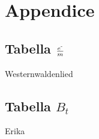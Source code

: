 \section{Appendice}

\subsection{Tabella $\frac{e^{\textrm{-}}}{m}$}
Westernwaldenlied
\subsection{Tabella $B_t$}
Erika
